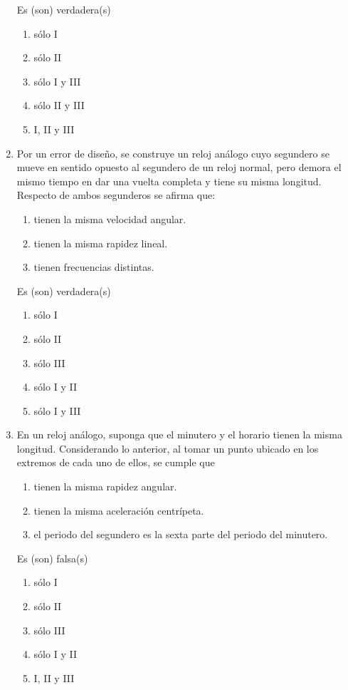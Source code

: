 \documentclass[letterpaper]{article}
\begin{document}
\begin{enumerate}
Es (son) verdadera(s)
\begin{enumerate}[label=\Alph*)]
\item sólo I
\item sólo II
\item sólo I y III
\item sólo II y III
\item I, II y III
\end{enumerate}

\item Por un error de diseño, se construye un reloj análogo cuyo segundero se mueve en sentido opuesto al segundero de un reloj normal, pero demora el mismo tiempo en dar una vuelta completa y tiene su misma longitud. Respecto de ambos segunderos se afirma que:
\begin{enumerate}[label=\Roman*)]
\item tienen la misma velocidad angular.
\item tienen la misma rapidez lineal.
\item tienen frecuencias distintas.
\end{enumerate}

Es (son) verdadera(s)
\begin{enumerate}[label=\Alph*)]
\item sólo I
\item sólo II
\item sólo III
\item sólo I y II
\item sólo I y III
\end{enumerate}

\item En un reloj análogo, suponga que el minutero y el horario tienen la misma longitud. Considerando lo anterior, al tomar un punto ubicado en los extremos de cada uno de ellos, se cumple que
\begin{enumerate}[label=\Roman*)]
\item tienen la misma rapidez angular.
\item tienen la misma aceleración centrípeta.
\item el periodo del segundero es la sexta parte del periodo del minutero.
\end{enumerate}

Es (son) falsa(s)
\begin{enumerate}[label=\Alph*)]
\item sólo I
\item sólo II
\item sólo III
\item sólo I y II
\item I, II y III
\end{enumerate}

\end{enumerate}
\end{document}
